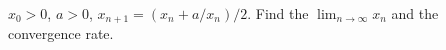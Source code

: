 $x_0 > 0$, $a > 0$, $x_{n+1} = (x_n + a/x_n)/2$. Find the $\lim_{n\to\infty} x_n$ and the convergence rate.

